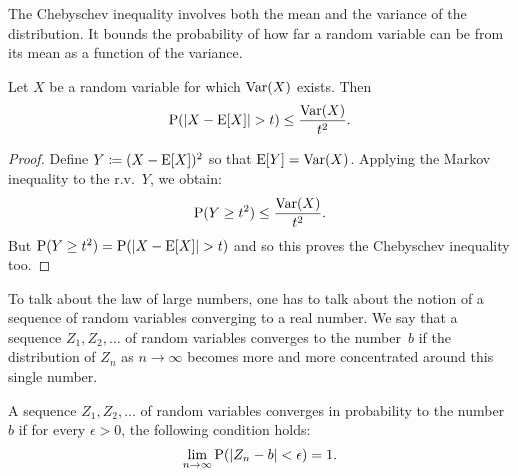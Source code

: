 The Chebyschev inequality involves both the mean and the variance of the 
distribution. It bounds the probability of how far a random variable can be 
from its mean as a function of the variance. 
\begin{theorem}
Let $X$ be a random variable for which $\operatorname{Var} (X)$ exists. Then 
\begin{equation} \label{ineq:chebyschev}
    \operatorname{P} (\left | X - \operatorname{E} [X] \right | > t) \leq \frac{\operatorname{Var} (X)}{t^2}.
\end{equation}
\end{theorem} 
\begin{proof}
Define $Y \coloneqq (X - \operatorname{E} [X])^2$ so that $\operatorname{E} [Y] = \operatorname{Var} (X)$. Applying
the Markov inequality to the r.v.~$Y$, we obtain:
\[
    \operatorname{P} (Y \geq t^2) \leq \frac{\operatorname{Var} (X)}{t^2}.
\] 
But $\operatorname{P} (Y \geq t^2) = \operatorname{P} (| X - \operatorname{E} [X] | > t)$ and so this proves the 
Chebyschev inequality too.
\end{proof}

To talk about the law of large numbers, one has to talk about the notion of 
a sequence of random variables converging to a real number. We say that 
a sequence $Z_1, Z_2, \ldots$ of random variables converges to the number~$b$
if the distribution of $Z_n$ as $n \to \infty$ becomes more and more 
concentrated around this single number. 
\begin{definition}
A sequence $Z_1, Z_2, \ldots$ of random variables converges in probability to 
the number~$b$ if for every $\epsilon > 0$, the following condition holds:
\begin{equation}
    \lim_{n \to \infty} \operatorname{P} (|Z_n - b| < \epsilon) = 1.
\end{equation}
\end{definition} 

